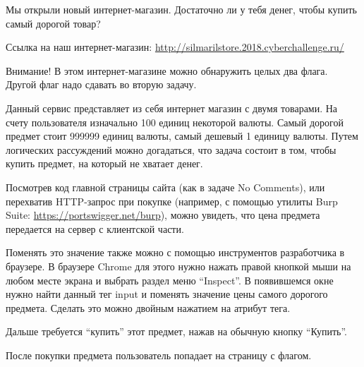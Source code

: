 
Мы открыли новый интернет-магазин. Достаточно ли у тебя денег, чтобы купить самый дорогой товар?

Ссылка на наш интернет-магазин: \url{http://silmarilstore.2018.cyberchallenge.ru/}

Внимание! В этом интернет-магазине можно обнаружить целых два флага. Другой флаг надо сдавать во вторую задачу.

\solutionSection

Данный сервис представляет из себя интернет магазин с двумя товарами. На счету пользователя изначально 100 единиц некоторой валюты. Самый дорогой предмет стоит 999999 единиц валюты, самый дешевый 1 единицу валюты. Путем логических рассуждений можно догадаться, что задача состоит в том, чтобы купить предмет, на который не хватает денег.

Посмотрев код главной страницы сайта (как в задаче No Comments), или перехватив HTTP-запрос при покупке (например, с помощью утилиты Burp Suite: \url{https://portswigger.net/burp}), можно увидеть, что цена предмета передается на сервер с клиентской части.


Поменять это значение также можно с помощью инструментов разработчика в браузере. В браузере Chrome для этого нужно нажать правой кнопкой мыши на любом месте экрана и выбрать раздел меню “Inspect”. В появившемся окне нужно найти данный тег input и поменять значение цены самого дорогого предмета. Сделать это можно двойным нажатием на атрибут тега.


Дальше требуется “купить” этот предмет, нажав на обычную кнопку “Купить”.

После покупки предмета пользователь попадает на страницу с флагом.


